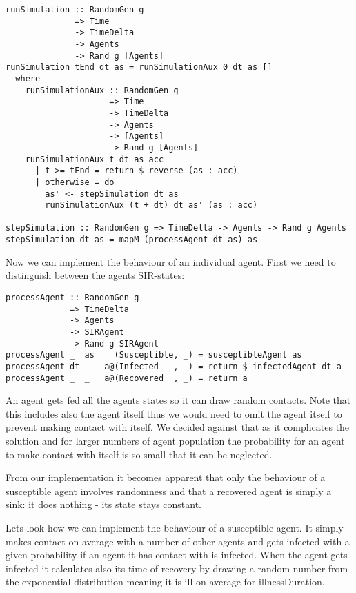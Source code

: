 \begin{verbatim}
runSimulation :: RandomGen g 
              => Time 
              -> TimeDelta 
              -> Agents 
              -> Rand g [Agents]
runSimulation tEnd dt as = runSimulationAux 0 dt as []
  where
    runSimulationAux :: RandomGen g 
                     => Time 
                     -> TimeDelta 
                     -> Agents 
                     -> [Agents] 
                     -> Rand g [Agents]
    runSimulationAux t dt as acc
      | t >= tEnd = return $ reverse (as : acc)
      | otherwise = do
        as' <- stepSimulation dt as 
        runSimulationAux (t + dt) dt as' (as : acc)

stepSimulation :: RandomGen g => TimeDelta -> Agents -> Rand g Agents
stepSimulation dt as = mapM (processAgent dt as) as
\end{verbatim}

Now we can implement the behaviour of an individual agent. First we need to distinguish between the agents SIR-states:

\begin{verbatim}
processAgent :: RandomGen g 
             => TimeDelta 
             -> Agents 
             -> SIRAgent 
             -> Rand g SIRAgent
processAgent _  as    (Susceptible, _) = susceptibleAgent as
processAgent dt _   a@(Infected   , _) = return $ infectedAgent dt a
processAgent _  _   a@(Recovered  , _) = return a
\end{verbatim}

An agent gets fed all the agents states so it can draw random contacts. Note that this includes also the agent itself thus we would need to omit the agent itself to prevent making contact with itself. We decided against that as it complicates the solution and for larger numbers of agent population the probability for an agent to make contact with itself is so small that it can be neglected.

From our implementation it becomes apparent that only the behaviour of a susceptible agent involves randomness and that a recovered agent is simply a sink: it does nothing - its state stays constant.

Lets look how we can implement the behaviour of a susceptible agent. It simply makes contact on average with a number of other agents and gets infected with a given probability if an agent it has contact with is infected.
When the agent gets infected it calculates also its time of recovery by drawing a random number from the exponential distribution meaning it is ill on average for illnessDuration.

